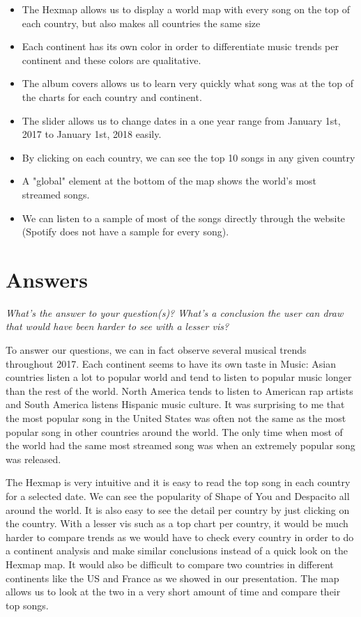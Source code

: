 \documentclass{article}
\begin{document}
\begin{itemize}
\item The Hexmap allows us to display a world map with every song on the top of each country, but also makes all countries the same size
\item Each continent has its own color in order to differentiate music trends per continent and these colors are qualitative.
\item The album covers allows us to learn very quickly what song was at the top of the charts for each country and continent.
\item The slider allows us to change dates in a one year range from January 1st, 2017 to January 1st, 2018 easily.
\item By clicking on each country, we can see the top 10 songs in any given country
\item A "global" element at the bottom of the map shows the world's most streamed songs.
\item We can listen to a sample of most of the songs directly through the website (Spotify does not have a sample for every song).
\end{itemize}

\newpage
\section{Answers}
\textit{What's the answer to your question(s)? What's a conclusion the user can draw that would have been harder to see with a lesser vis?}
\newline
\par To answer our questions, we can in fact observe several musical trends throughout 2017. Each continent seems to have its own taste in Music: Asian countries listen a lot to popular world and tend to listen to popular music longer than the rest of the world. North America tends to listen to American rap artists and South America listens Hispanic music culture. It was surprising to me that the most popular song in the United States was often not the same as the most popular song in other countries around the world. The only time when most of the world had the same most streamed song was when an extremely popular song was released.

The Hexmap is very intuitive and it is easy to read the top song in each country for a selected date. We can see the popularity of Shape of You and Despacito all around the world. It is also easy to see the detail per country by just clicking on the country. With a lesser vis such as a top chart per country, it would be much harder to compare trends as we would have to check every country in order to do a continent analysis and make similar conclusions instead of a quick look on the Hexmap map. It would also be difficult to compare two countries in different continents like the US and France as we showed in our presentation. The map allows us to look at the two in a very short amount of time and compare their top songs.
\end{document}
